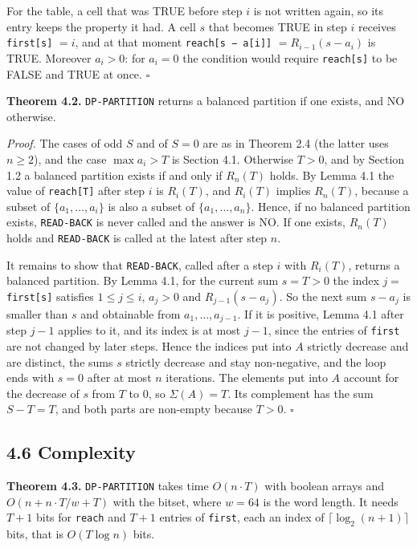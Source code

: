 \documentclass[
]{article}
\begin{document}
For the table, a cell that was TRUE before step \(i\) is not written
again, so its entry keeps the property it had. A cell \(s\) that becomes
TRUE in step \(i\) receives \texttt{first{[}s{]}} \(= i\), and at that
moment \texttt{reach{[}s\ −\ a{[}i{]}{]}} \(= R_{i-1}(s - a_i)\) is
TRUE. Moreover \(a_i > 0\): for \(a_i = 0\) the condition would require
\texttt{reach{[}s{]}} to be FALSE and TRUE at once. \(\square\)

\textbf{Theorem 4.2.} \texttt{DP-PARTITION} returns a balanced partition
if one exists, and NO otherwise.

\emph{Proof.} The cases of odd \(S\) and of \(S = 0\) are as in Theorem
2.4 (the latter uses \(n \ge 2\)), and the case \(\max a_i > T\) is
Section 4.1. Otherwise \(T > 0\), and by Section 1.2 a balanced
partition exists if and only if \(R_n(T)\) holds. By Lemma 4.1 the value
of \texttt{reach{[}T{]}} after step \(i\) is \(R_i(T)\), and \(R_i(T)\)
implies \(R_n(T)\), because a subset of
\(\lbrace a_1, \dots, a_i \rbrace\) is also a subset of
\(\lbrace a_1, \dots, a_n \rbrace\). Hence, if no balanced partition
exists, \texttt{READ-BACK} is never called and the answer is NO. If one
exists, \(R_n(T)\) holds and \texttt{READ-BACK} is called at the latest
after step \(n\).

It remains to show that \texttt{READ-BACK}, called after a step \(i\)
with \(R_i(T)\), returns a balanced partition. By Lemma 4.1, for the
current sum \(s = T > 0\) the index \(j =\) \texttt{first{[}s{]}}
satisfies \(1 \le j \le i\), \(a_j > 0\) and \(R_{j-1}(s - a_j)\). So
the next sum \(s - a_j\) is smaller than \(s\) and obtainable from
\(a_1, \dots, a_{j-1}\). If it is positive, Lemma 4.1 after step
\(j - 1\) applies to it, and its index is at most \(j - 1\), since the
entries of \texttt{first} are not changed by later steps. Hence the
indices put into \(A\) strictly decrease and are distinct, the sums
\(s\) strictly decrease and stay non-negative, and the loop ends with
\(s = 0\) after at most \(n\) iterations. The elements put into \(A\)
account for the decrease of \(s\) from \(T\) to \(0\), so
\(\Sigma(A) = T\). Its complement has the sum \(S - T = T\), and both
parts are non-empty because \(T > 0\). \(\square\)

\hypertarget{complexity-2}{%
\subsection{4.6 Complexity}\label{complexity-2}}

\textbf{Theorem 4.3.} \texttt{DP-PARTITION} takes time \(O(n \cdot T)\)
with boolean arrays and \(O(n + n \cdot T/w + T)\) with the bitset,
where \(w = 64\) is the word length. It needs \(T + 1\) bits for
\texttt{reach} and \(T + 1\) entries of \texttt{first}, each an index of
\(\lceil \log_2 (n+1) \rceil\) bits, that is \(O(T \log n)\) bits.
\end{document}
